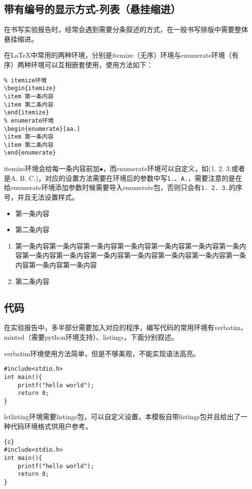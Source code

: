 \subsection{带有编号的显示方式-列表（悬挂缩进）}
在书写实验报告时，经常会遇到需要分条叙述的方式，在一般书写排版中需要整体悬挂缩进。

在\LaTeX 中常用的两种环境，分别是itemize（无序）环境与enumerate环境（有序）两种环境可以互相嵌套使用，使用方法如下：
\begin{verbatim}
% itemize环境
\begin{itemize}
\item 第一条内容
\item 第二条内容
\end{itemize}
% enumerate环境
\begin{enumerate}[aa.]
\item 第一条内容
\item 第二条内容
\end{enumerate}
\end{verbatim}
itemize环境会给每一条内容前加$\bullet$，而enumerate环境可以自定义，如(1. 2. 3.或者是A. B. C.)，对应的设置方法需要在环境后的参数中写\verb|1.|、\verb|A.|，需要注意的是在给enumerate环境添加参数时候需要导入enumerate包，否则只会有\verb|1. 2. 3.|的序号，并且无法设置样式。
\begin{itemize}
\item 第一条内容
\item 第二条内容
\end{itemize}
\begin{enumerate}[aa.]
\item 第一条内容第一条内容第一条内容第一条内容第一条内容第一条内容第一条内容第一条内容第一条内容第一条内容第一条内容第一条内容第一条内容第一条内容第一条内容第一条内容
\item 第二条内容
\end{enumerate}
\subsection{代码}
在实验报告中，多半部分需要加入对应的程序，编写代码的常用环境有verbatim、minted（需要python环境支持）、listings，下面分别叙述。

verbatim环境使用方法简单，但是不够美观，不能实现语法高亮。
\begin{verbatim}
#include<stdio.h>
int main(){
	printf("hello world");
	return 0;
}
\end{verbatim}

lstlisting环境需要listings包，可以自定义设置，本模板自带listings包并且给出了一种代码环境格式供用户参考。
\begin{lstlisting}{c}
#include<stdio.h>
int main(){
	printf("hello world");
	return 0;
}
\end{lstlisting}

